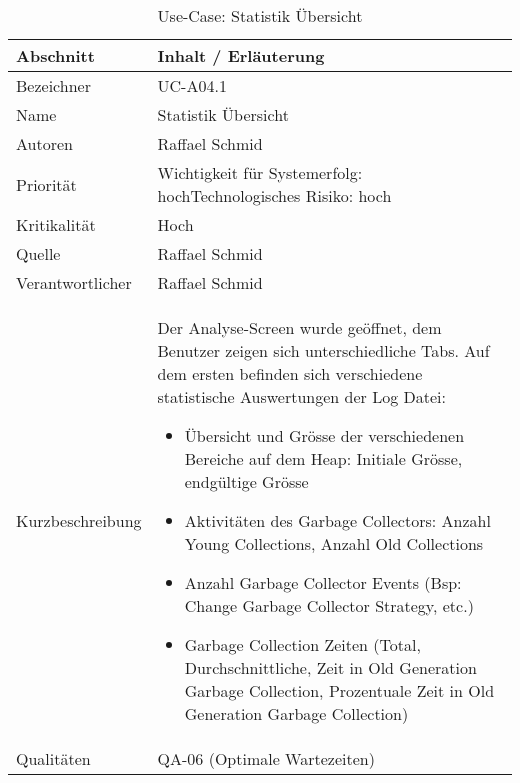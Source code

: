 \begin{longtable}{|p{4cm}|p{10.5cm}|}
\caption{Use-Case: Statistik Übersicht}\\\hline
   \textbf{Abschnitt} & \textbf{Inhalt / Erläuterung} \\\hline
   Bezeichner & UC-A04.1\\\hline
   Name & Statistik Übersicht\\\hline
   Autoren & Raffael Schmid\\\hline
   Priorität & Wichtigkeit für Systemerfolg: hoch\newline Technologisches Risiko: hoch\\\hline
   Kritikalität & Hoch\\\hline
   Quelle & Raffael Schmid\\\hline
   Verantwortlicher & Raffael Schmid\\\hline
   Kurzbeschreibung & Der Analyse-Screen wurde geöffnet, dem Benutzer zeigen sich unterschiedliche Tabs. Auf dem ersten befinden sich verschiedene statistische Auswertungen der Log Datei:
   \begin{itemize}
	\item Übersicht und Grösse der verschiedenen Bereiche auf dem Heap: Initiale Grösse, endgültige Grösse
	\item Aktivitäten des Garbage Collectors: Anzahl Young Collections, Anzahl Old Collections
	\item Anzahl Garbage Collector Events (Bsp: Change Garbage Collector Strategy, etc.)
	\item Garbage Collection Zeiten (Total, Durchschnittliche, Zeit in Old Generation Garbage Collection, Prozentuale Zeit in Old Generation Garbage Collection)
   \end{itemize}
 \\\hline
   Qualitäten & QA-06 (Optimale Wartezeiten)\\\hline
\end{longtable}

